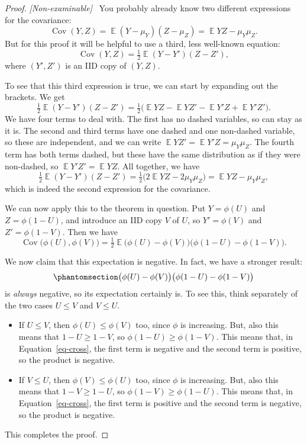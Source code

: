 \documentclass[
  letterpaper,
  DIV=11,
  numbers=noendperiod]{scrreprt}
\newcommand{\Exg}{\operatorname{\mathbb{E}}}
\theoremstyle{plain}
\theoremstyle{definition}
\theoremstyle{definition}
\theoremstyle{remark}
\begin{document}
\begin{proof}
\emph{{[}Non-examinable{]}} ~You probably already know two different
expressions for the covariance:
\[ \operatorname{Cov}(Y, Z) = \Exg (Y - \mu_Y)(Z - \mu_Z) = \Exg YZ - \mu_Y \mu_Z . \]
But for this proof it will be helpful to use a third, less well-known
equation:
\[ \operatorname{Cov}(Y, Z) = \tfrac12 \Exg (Y - Y')(Z - Z') , \] where
\((Y', Z')\) is an IID copy of \((Y, Z)\).

To see that this third expression is true, we can start by expanding out
the brackets. We get
\[ \tfrac12 \Exg (Y - Y')(Z - Z')  = \tfrac12 \big( \Exg YZ - \Exg YZ' - \Exg Y'Z + \Exg Y'Z' \big) . \]
We have four terms to deal with. The first has no dashed variables, so
can stay as it is. The second and third terms have one dashed and one
non-dashed variable, so these are independent, and we can write
\(\Exg YZ' = \Exg Y'Z = \mu_Y \mu_Z\). The fourth term has both terms
dashed, but these have the same distribution as if they were non-dashed,
so \(\Exg Y'Z' = \Exg YZ\). All together, we have
\[ \tfrac12 \Exg (Y - Y')(Z - Z') = \tfrac12 \big(2\Exg YZ - 2\mu_Y\mu_Z \big) = \Exg YZ - \mu_Y\mu_Z , \]
which is indeed the second expression for the covariance.

We can now apply this to the theorem in question. Put \(Y = \phi(U)\)
and \(Z = \phi(1-U)\), and introduce an IID copy \(V\) of \(U\), so
\(Y' = \phi(V)\) and \(Z' = \phi(1 - V)\). Then we have
\[  \operatorname{Cov}\big(\phi(U), \phi(V)\big) = \tfrac 12 \Exg \big(\phi(U) - \phi(V)\big)\big(\phi(1-U) - \phi(1-V)\big) .\]

We now claim that this expectation is negative. In fact, we have a
stronger result:
\begin{equation}\phantomsection\label{eq-cross}{\big(\phi(U) - \phi(V)\big)\big(\phi(1-U) - \phi(1-V)\big)}\end{equation}
is \emph{always} negative, so its expectation certainly is. To see this,
think separately of the two cases \(U \leq V\) and \(V \leq U\).

\begin{itemize}
\item
  If \(U \leq V\), then \(\phi(U) \leq \phi(V)\) too, since \(\phi\) is
  increasing. But, also this means that \(1-U \geq 1-V\), so
  \(\phi(1 - U) \geq \phi(1-V)\). This means that, in
  Equation~\ref{eq-cross}, the first term is negative and the second
  term is positive, so the product is negative.
\item
  If \(V \leq U\), then \(\phi(V) \leq \phi(U)\) too, since \(\phi\) is
  increasing. But, also this means that \(1-V \geq 1-U\), so
  \(\phi(1 - V) \geq \phi(1-U)\). This means that, in
  Equation~\ref{eq-cross}, the first term is positive and the second
  term is negative, so the product is negative.
\end{itemize}

This completes the proof.
\end{proof}
\end{document}
